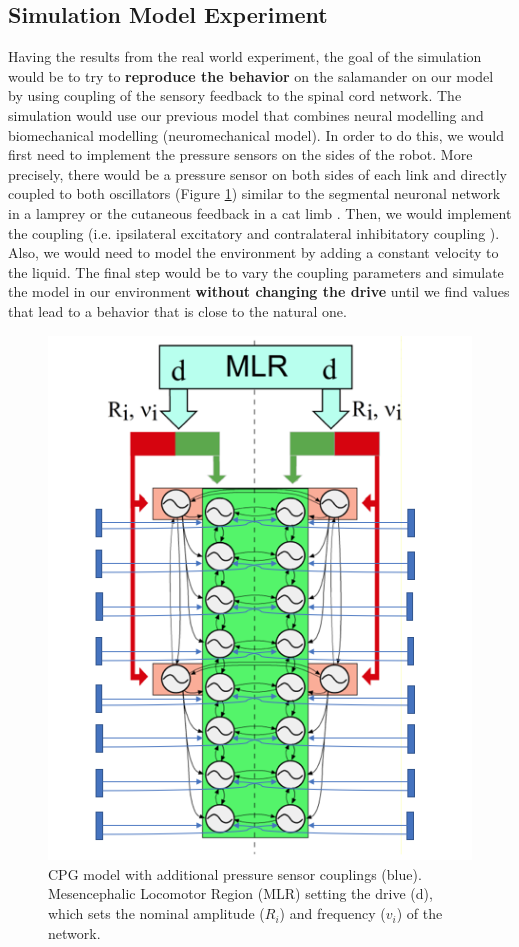 \documentclass{article}
\begin{document}
\subsection{Simulation Model Experiment}
Having the results from the real world experiment, the goal of the simulation would be to try to \textbf{reproduce the behavior} on the salamander on our model by using coupling of the sensory feedback to the spinal cord network. The simulation would use our previous model that combines neural modelling and biomechanical modelling (neuromechanical model). In order to do this, we would first need to implement the pressure sensors on the sides of the robot. More precisely, there would be a pressure sensor on both sides of each link and directly coupled to both oscillators (Figure \ref{Network}) similar to the segmental neuronal network in a lamprey \cite{GRILLNER1995270} or the cutaneous feedback in a cat limb \cite{frigon06}. Then, we would implement the coupling (i.e. ipsilateral excitatory and contralateral inhibitatory coupling \cite{GRILLNER1995270}). Also, we would need to model the environment by adding a constant velocity to the liquid. The final step would be to vary the coupling parameters and simulate the model in our environment \textbf{without changing the drive} until we find values that lead to a behavior that is close to the natural one. 

\begin{figure}[h]
    \centering
    \includegraphics[scale=0.5]{New_Network.png}
    \caption{CPG model with additional pressure sensor couplings (blue). Mesencephalic Locomotor Region (MLR) setting the drive (d), which sets the nominal amplitude ($R_i$) and frequency ($v_i$) of the network.}
    \label{Network}
\end{figure}
\end{document}

